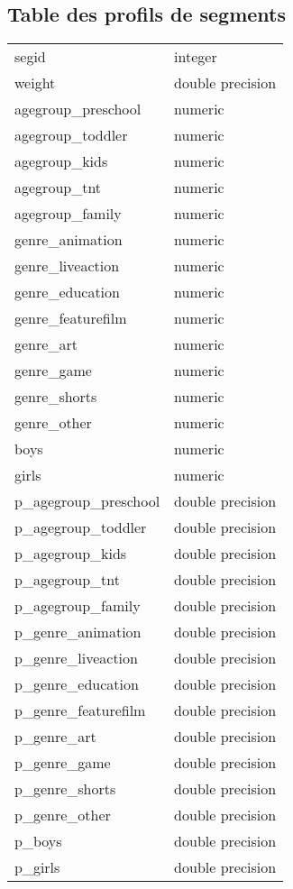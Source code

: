 \documentclass[a4paper,11pt]{article}
\begin{document}
\subsection{Table des profils de segments}
\begin{tabular}{ll}
segid                & integer          \\ 
 weight               & double precision \\ 
 agegroup\_preschool   & numeric          \\ 
 agegroup\_toddler     & numeric          \\ 
 agegroup\_kids        & numeric          \\ 
 agegroup\_tnt         & numeric          \\ 
 agegroup\_family      & numeric          \\ 
 genre\_animation      & numeric          \\ 
 genre\_liveaction     & numeric          \\ 
 genre\_education      & numeric          \\ 
 genre\_featurefilm    & numeric          \\ 
 genre\_art            & numeric          \\ 
 genre\_game           & numeric          \\ 
 genre\_shorts         & numeric          \\ 
 genre\_other          & numeric          \\ 
 boys                 & numeric          \\ 
 girls                & numeric          \\ 
 p\_agegroup\_preschool & double precision \\ 
 p\_agegroup\_toddler   & double precision \\ 
 p\_agegroup\_kids      & double precision \\ 
 p\_agegroup\_tnt       & double precision \\ 
 p\_agegroup\_family    & double precision \\ 
 p\_genre\_animation    & double precision \\ 
 p\_genre\_liveaction   & double precision \\ 
 p\_genre\_education    & double precision \\ 
 p\_genre\_featurefilm  & double precision \\ 
 p\_genre\_art          & double precision \\ 
 p\_genre\_game         & double precision \\ 
 p\_genre\_shorts       & double precision \\ 
 p\_genre\_other        & double precision \\ 
 p\_boys               & double precision \\ 
 p\_girls              & double precision 
\end{tabular}
\end{document}
